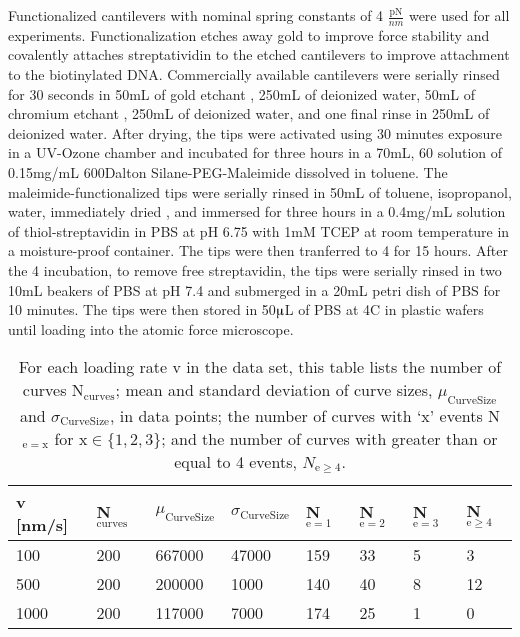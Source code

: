 \firstp Functionalized cantilevers with nominal spring constants of 4 $\frac{\text{pN}}{nm}$  were used for all experiments. Functionalization etches away gold to improve force stability\cite{sullan_atomic_2013} and covalently attaches streptatividin to the etched cantilevers to improve attachment to the biotinylated DNA. Commercially available cantilevers  were serially rinsed for 30 seconds in 50mL of gold etchant , 250mL of deionized water, 50mL of chromium etchant , 250mL of deionized water, and one final rinse in 250mL of deionized water. After drying, the tips were activated using 30 minutes exposure in a UV-Ozone chamber and incubated for three hours in a 70mL, 60\degreeC{} solution of 0.15mg/mL 600Dalton Silane-PEG-Maleimide  dissolved in toluene. The maleimide-functionalized tips were serially rinsed in 50mL of toluene, isopropanol, water, immediately dried , and immersed for three hours in a 0.4mg/mL solution of thiol-streptavidin  in PBS  at pH 6.75 with 1mM TCEP  at room temperature in a moisture-proof container. The tips were then tranferred to 4\degreeC{} for 15 hours. After the 4\degreeC{} incubation, to remove free streptavidin, the tips were serially rinsed in two 10mL beakers of PBS at pH 7.4 and submerged in a 20mL petri dish of PBS for 10 minutes. The tips were then stored in 50$\muup$L of PBS at 4C in plastic wafers  until loading into the atomic force microscope. \pl


\begin{table}
\begin{tabularx}{\textwidth}{ l | l | l | l |l |l|l|l }
\hline \hline
v [nm/s] & N$_\mathrm{curves}$ & $\mu_{\mathrm{Curve Size}}$ & $\sigma_{\mathrm{Curve Size}}$ & N$_{\mathrm{e}= 1}$ & N$_{\mathrm{e}= 2}$ & N$_{\mathrm{e}= 3}$ & N$_{\mathrm{e}\ge4}$  \\ \hline
100 & 200 & 667000 & 47000 & 159 & 33 & 5 & 3  \\ \hline
500 & 200 & 200000 & 1000 & 140 & 40 & 8 & 12  \\ \hline
1000 & 200 & 117000 & 7000 & 174 & 25 & 1 & 0  \\ \hline
\end{tabularx}
\caption[Data set statistical information]{ For each loading rate v in the data set, this table lists the number of curves N$_{\mathrm{curves}}$; mean and standard deviation of curve sizes, $\mu_{\mathrm{Curve Size}}$ and $\sigma_{\mathrm{Curve Size}}$, in data points; the number of curves with `x' events N$_{\mathrm{e=x}}$ for x$\in\{1,2,3\}$; and the number of curves with greater than or equal to 4 events, $N_{\mathrm{e}\ge4}$. }
\end{table}



